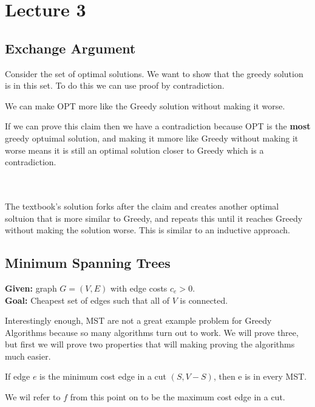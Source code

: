\documentclass[oneside]{book}
\begin{document}
\chapter{Lecture 3}

\section{Exchange Argument}

Consider the set of optimal solutions. We want to show that the greedy solution is in this set. To do this we can use proof by contradiction.


\clm {} {
    We can make OPT more like the Greedy solution without making it worse.
}

If we can prove this claim then we have a contradiction because OPT is the \textbf{most} greedy optuimal solution, and making it mmore like Greedy without making it worse means it is still an optimal solution closer to Greedy which is a contradiction.

\\\\
The textbook's solution forks after the claim and creates another optimal soltuion that is more similar to Greedy, and repeats this until it reaches Greedy without making the solution worse. This is similar to an inductive approach.

\section{Minimum Spanning Trees}

 {
    \textbf{Given: } graph $G=(V,E)$ with edge costs $c_e > 0$.\\
     \textbf{Goal: } Cheapest set of edges such that all of $V$ is connected.
}

Interestingly enough, MST are not a great example problem for Greedy Algorithms because so many algorithms turn out to work. We will prove three, but first we will prove two properties that will making proving the algorithms much easier.

 {
    If edge $e$ is the minimum cost edge in a cut $(S, V-S)$, then e is in every MST.
}

We wil refer to $f$ from this point on to be the maximum cost edge in a cut.
\end{document}

